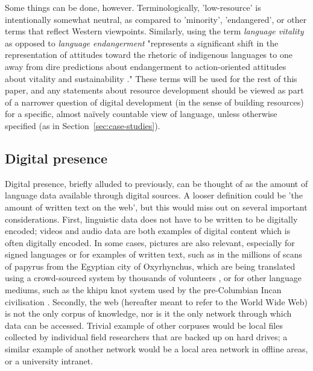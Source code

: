 Some things can be done, however. Terminologically, 'low-resource' is intentionally somewhat neutral, as compared to 'minority', 'endangered', or other terms that reflect Western viewpoints. Similarly, using the term {\it language vitality} as opposed to {\it language endangerment} "represents a significant shift in the representation of attitudes toward the rhetoric of indigenous languages to one away from dire predictions about endangerment to action-oriented attitudes about vitality and sustainability \citep{grenoble2016response}." These terms will be used for the rest of this paper, and any statements about resource development should be viewed as part of a narrower question of digital development (in the sense of building resources) for a specific, almost na\"ively countable view of language, unless otherwise specified (as in Section~\ref{sec:case-studies}).




\subsection{Digital presence}


Digital presence, briefly alluded to previously, can be thought of as the amount of language data available through digital sources. A looser definition could be 'the amount of written text on the web', but this would miss out on several important considerations. First, linguistic data does not have to be written to be digitally encoded; videos and audio data are both examples of digital content which is often digitally encoded. In some cases, pictures are also relevant, especially for signed languages or for examples of written text, such as in the millions of scans of papyrus from the Egyptian city of Oxyrhynchus, which are being translated using a crowd-sourced system by thousands of volunteers \citep{williams2014computational}, or for other language mediums, such as the khipu knot system used by the pre-Columbian Incan civilisation \citep{quilter2002narrative}. Secondly, the web (hereafter meant to refer to the World Wide Web) is not the only corpus of knowledge, nor is it the only network through which data can be accessed. Trivial example of other corpuses would be local files collected by individual field researchers that are backed up on hard drives; a similar example of another network would be a local area network in offline areas, or a university intranet.

